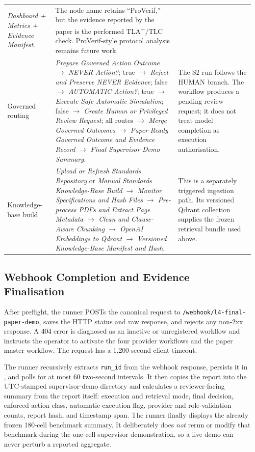\documentclass[journal]{IEEEtran}
\newcommand{\artifactpath}[1]{\path{#1}}
\begin{document}
\begin{table}[!t]
\begin{adjustbox}{width=\textwidth}
\begin{tabular}{L{2.3cm}L{9.4cm}L{6.4cm}}
\emph{Dashboard + Metrics + Evidence Manifest}. &
The node name retains ``ProVerif,'' but the evidence reported by the paper is
the performed TLA\textsuperscript{+}/TLC check. ProVerif-style protocol
analysis remains future work. \\
Governed routing &
\emph{Prepare Governed Action Outcome} $\rightarrow$
\emph{NEVER Action?}; true $\rightarrow$
\emph{Reject and Preserve NEVER Evidence}; false $\rightarrow$
\emph{AUTOMATIC Action?}; true $\rightarrow$
\emph{Execute Safe Automatic Simulation}; false $\rightarrow$
\emph{Create Human or Privileged Review Request}; all routes $\rightarrow$
\emph{Merge Governed Outcomes} $\rightarrow$
\emph{Paper-Ready Governed Outcome and Evidence Record} $\rightarrow$
\emph{Final Supervisor Demo Summary}. &
The S2 run follows the HUMAN branch. The workflow produces a pending review
request; it does not treat model completion as execution authorisation. \\
Knowledge-base build &
\emph{Upload or Refresh Standards Repository} or
\emph{Manual Standards Knowledge-Base Build} $\rightarrow$
\emph{Monitor Specifications and Hash Files} $\rightarrow$
\emph{Pre-process PDFs and Extract Page Metadata} $\rightarrow$
\emph{Clean and Clause-Aware Chunking} $\rightarrow$
\emph{OpenAI Embeddings to Qdrant} $\rightarrow$
\emph{Versioned Knowledge-Base Manifest and Hash}. &
This is a separately triggered ingestion path. Its versioned Qdrant
collection supplies the frozen retrieval bundle used above. \\
\bottomrule
\end{tabular}
\end{adjustbox}
\end{table}

\subsection{Webhook Completion and Evidence Finalisation}
After preflight, the runner POSTs the canonical request to
\texttt{/webhook/l4-final-paper-demo}, saves the HTTP status and raw response,
and rejects any non-2xx response. A 404 error is diagnosed as an inactive or
unregistered workflow and instructs the operator to activate the four
provider workflows and the paper master workflow. The request has a
1{,}200-second client timeout.

The runner recursively extracts \texttt{run\_id} from the webhook response,
persists it in \artifactpath{run_id.txt}, and polls
\artifactpath{runtime/evidence/<run_id>/final_report.json} for at most 60
two-second intervals. It then copies the report into the UTC-stamped
supervisor-demo directory and calculates a reviewer-facing summary from the
report itself: execution and retrieval mode, final decision, enforced action
class, automatic-execution flag, provider and role-validation counts, report
hash, and timestamp span. The runner finally displays the already frozen
180-cell benchmark summary. It deliberately does \emph{not} rerun or modify
that benchmark during the one-cell supervisor demonstration, so a live demo
can never perturb a reported aggregate.
\end{document}
